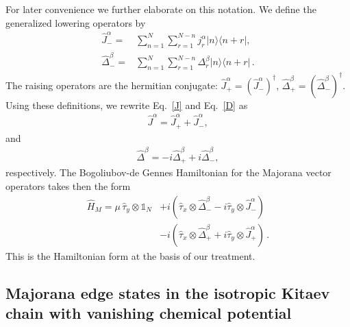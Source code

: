 \documentclass[pra,twocolumn,
superscriptaddress,
showpacs,
aps
]{revtex4-1}
\begin{document}
For later convenience we further elaborate on this notation. We  define the generalized lowering operators by
\begin{align}
\hat{J}^{\alpha}_{-}=&\sum_{n=1}^N\sum_{r=1}^{N-n}j_r^{\alpha}|n\rangle\langle n+r|,\\
\hat{\Delta}^{\beta}_{-}=&\sum_{n=1}^N\sum_{r=1}^{N-n}\Delta_r^{\beta}|n\rangle\langle n+r|\,.
\end{align}
The raising operators are the hermitian conjugate: ${\hat{J}_{+}^{\alpha}=(\hat{J}_{-}^{\alpha})^{\dag}}$, ${\hat{\Delta}_{+}^{\beta}=(\hat{\Delta}_{-}^{\beta})^{\dag}}$. Using these definitions, we rewrite Eq.~\eqref{J} and Eq.~\eqref{D} as
\begin{align}
\hat{J}^{\alpha}=\hat{J}_{+}^{\alpha}+\hat{J}_{-}^{\alpha},
\end{align}
and
\begin{align}
\hat{\Delta}^{\beta}=-i\hat{\Delta}_{+}^{\beta}+i\hat{\Delta}_{-}^{\beta},
\end{align}
respectively. The Bogoliubov-de Gennes Hamiltonian for the Majorana vector operators takes then the form
\begin{align}
\hat{H}_{M}=\mu\,\hat{\tau}_y\otimes\mathbb{1}_N&+i\left(\hat{\tau}_x\otimes \hat{\Delta}^{\beta}_{-}-i\hat{\tau}_y\otimes \hat{J}_{-}^{\alpha}\right)\nonumber\\
&-i\left(\hat{\tau}_x\otimes \hat{\Delta}^{\beta}_{+}+i\hat{\tau}_y\otimes \hat{J}_{+}^{\alpha}\right)\,.\label{HM}
\end{align}
This is the Hamiltonian form at the basis of our treatment. 

\subsection{Majorana edge states in the isotropic Kitaev chain with vanishing chemical potential}
\end{document}

